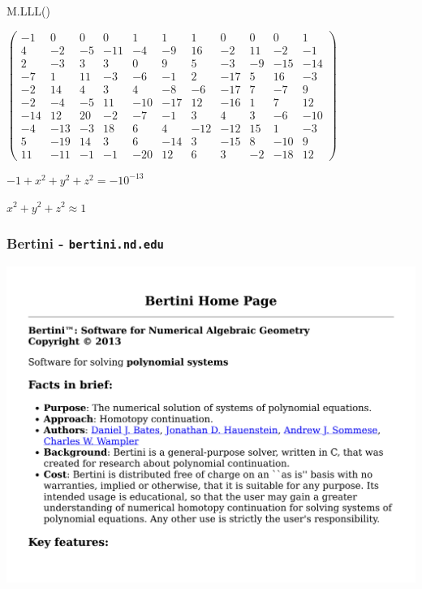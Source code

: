 \documentclass{beamer}
\begin{document}
\begin{frame}
\begin{semiverbatim}
\small

M.LLL()


$\left(\begin{array}{rrrrrrrrrrr}
-1 & 0 & 0 & 0 & 1 & 1 & 1 & 0 & 0 & 0 & 1 \\
4 & -2 & -5 & -11 & -4 & -9 & 16 & -2 & 11 & -2 & -1 \\
2 & -3 & 3 & 3 & 0 & 9 & 5 & -3 & -9 & -15 & -14 \\
-7 & 1 & 11 & -3 & -6 & -1 & 2 & -17 & 5 & 16 & -3 \\
-2 & 14 & 4 & 3 & 4 & -8 & -6 & -17 & 7 & -7 & 9 \\
-2 & -4 & -5 & 11 & -10 & -17 & 12 & -16 & 1 & 7 & 12 \\
-14 & 12 & 20 & -2 & -7 & -1 & 3 & 4 & 3 & -6 & -10 \\
-4 & -13 & -3 & 18 & 6 & 4 & -12 & -12 & 15 & 1 & -3 \\
5 & -19 & 14 & 3 & 6 & -14 & 3 & -15 & 8 & -10 & 9 \\
11 & -11 & -1 & -1 & -20 & 12 & 6 & 3 & -2 & -18 & 12
\end{array}\right)$




\centerline{$-1 + x^2 + y^2 + z^2 = -10^{-13}$}

\centerline{$x^2 + y^2 + z^2 \approx 1$}


\end{semiverbatim}
\end{frame}

\begin{frame}[fragile]
\frametitle{Bertini - {\tt bertini.nd.edu}}
\includegraphics[page=1, clip, trim=0in 1.5in 0in 0in, width=\textwidth]{bertini.nd.edu.pdf}
\end{frame}
\end{document}
